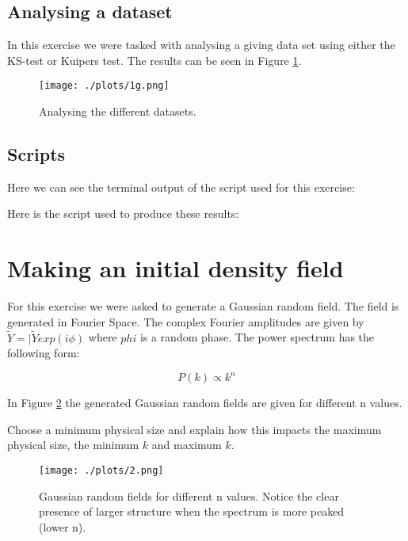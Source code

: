 \documentclass[a4paper,10pt]{article}
\begin{document}
\subsection{Analysing a dataset}

In this exercise we were tasked with analysing a giving data set using either the KS-test or Kuipers test. The results can be seen in Figure \ref{fig:1g}.

\begin{figure}[h!]
  \centering
  \texttt{[image: ./plots/1g.png]}
  \caption{Analysing the different datasets.}
  \label{fig:1g}
\end{figure}

\subsection{Scripts}

Here we can see the terminal output of the script used for this exercise:


Here is the script used to produce these results: 


\section{Making an initial density field}

For this exercise we were asked to generate a Gaussian random field. The field is generated in Fourier Space. The complex Fourier amplitudes are given by $\tilde{Y}=|\tilde{Y}exp(i\phi)$ where $phi$ is a random phase. The power spectrum has the following form: 

\begin{equation}
P(k) \propto k^n
\end{equation}

In Figure \ref{fig:2} the generated Gaussian random fields are given for different n values. 

\color{red}
Choose a minimum physical size and explain how this impacts the maximum physical size, the minimum $k$ and maximum $k$. 

\color{black}

\begin{figure}[h!]
  \centering
  \texttt{[image: ./plots/2.png]}
  \caption{Gaussian random fields for different n values. Notice the clear presence of larger structure when the spectrum is more peaked (lower n).}
  \label{fig:2}
\end{figure}
\end{document}
